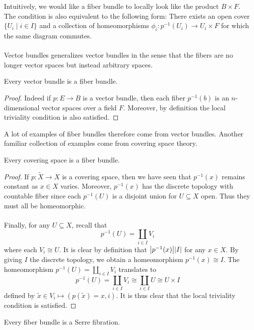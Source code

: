 \documentclass[a4paper]{article}
\begin{document}
Intuitively, we would like a fiber bundle to locally look like the product $B\times F$. The condition is also equivalent to the following form: There exists an open cover $\{U_i\;|\;i\in I\}$ and a collection of homeomorphisms $\phi_i:p^{-1}(U_i)\to U_i\times F$ for which the same diagram commutes. \\~\\

Vector bundles generalizes vector bundles in the sense that the fibers are no longer vector spaces but instead arbitrary spaces. 

\begin{lmm}{}{} Every vector bundle is a fiber bundle. \tcbline
\begin{proof}
Indeed if $p:E\to B$ is a vector bundle, then each fiber $p^{-1}(b)$ is an $n$-dimensional vector spaces over a field $F$. Moreover, by definition the local triviality condition is also satisfied. 
\end{proof}
\end{lmm}

A lot of examples of fiber bundles therefore come from vector bundles. Another familiar collection of examples come from covering space theory. 

\begin{lmm}{}{} Every covering space is a fiber bundle. \tcbline
\begin{proof}
If $p:\tilde{X}\to X$ is a covering space, then we have seen that $p^{-1}(x)$ remains constant as $x\in X$ varies. Moreover, $p^{-1}(x)$ has the discrete topology with countable fiber since each $p^{-1}(U)$ is a disjoint union for $U\subseteq X$ open. Thus they must all be homeomorphic. \\~\\

Finally, for any $U\subseteq X$, recall that $$p^{-1}(U)=\coprod_{i\in I}V_i$$ where each $V_i\cong U$. It is clear by definition that $\abs{p^{-1}(x)}\abs{I}$ for any $x\in X$. By giving $I$ the discrete topology, we obtain a homeomorphism $p^{-1}(x)\cong I$. The homeomorphism $p^{-1}(U)=\coprod_{i\in I}V_i$ translates to $$p^{-1}(U)=\coprod_{i\in I}V_i\cong\coprod_{i\in I}U\cong U\times I$$ defined by $\tilde{x}\in V_i\mapsto(p(\tilde{x})=x,i)$. It is thus clear that the local triviality condition is satisfied. 
\end{proof}
\end{lmm}

\begin{prp}{}{} Every fiber bundle is a Serre fibration. 
\end{prp}
\end{document}
